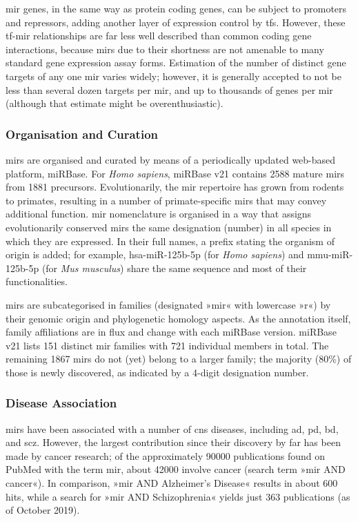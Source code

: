 \ac{mir} genes, in the same way as protein coding genes, can be subject to promoters and repressors, adding another layer of expression control by \acp{tf}. However, these \ac{tf}-\ac{mir} relationships are far less well described than common coding gene interactions, because \acp{mir} due to their shortness are not amenable to many standard gene expression assay forms. Estimation of the number of distinct gene targets of any one \ac{mir} varies widely; however, it is generally accepted to not be less than several dozen targets per \ac{mir}, and up to thousands of genes per \ac{mir} (although that estimate might be overenthusiastic).

\subsubsection{Organisation and Curation}
\acp{mir} are organised and curated by means of a periodically updated web-based platform, miRBase.\cite{Kozomara2019} For \textit{Homo sapiens}, miRBase v21 contains 2588 mature \acp{mir} from 1881 precursors. Evolutionarily, the \ac{mir} repertoire has grown from rodents to primates, resulting in a number of primate-specific \acp{mir} that may convey additional function. \ac{mir} nomenclature is organised\cite{Ambros2003} in a way that assigns evolutionarily conserved \acp{mir} the same designation (number) in all species in which they are expressed. In their full names, a prefix stating the organism of origin is added; for example, hsa-miR-125b-5p (for \textit{Homo sapiens}) and mmu-miR-125b-5p (for \textit{Mus musculus}) share the same sequence and most of their functionalities.

\acp{mir} are subcategorised in families (designated »mir« with lowercase »r«) by their genomic origin and phylogenetic homology aspects. As the annotation itself, family affiliations are in flux and change with each miRBase version. miRBase v21 lists 151 distinct \ac{mir} families with 721 individual members in total. The remaining 1867 \acp{mir} do not (yet) belong to a larger family; the majority (80\%) of those is newly discovered, as indicated by a 4-digit designation number.

\subsubsection{Disease Association}
\acp{mir} have been associated with a number of \ac{cns} diseases, including \ac{ad}, \ac{pd}, \ac{bd}, and \ac{scz}. However, the largest contribution since their discovery by far has been made by cancer research; of the approximately \num{90000} publications found on PubMed with the term \ac{mir}, about \num{42000} involve cancer (search term »\ac{mir} AND cancer«). In comparison, »\ac{mir} AND Alzheimer's Disease« results in about 600 hits, while a search for »\ac{mir} AND Schizophrenia« yields just 363 publications (as of October 2019).


